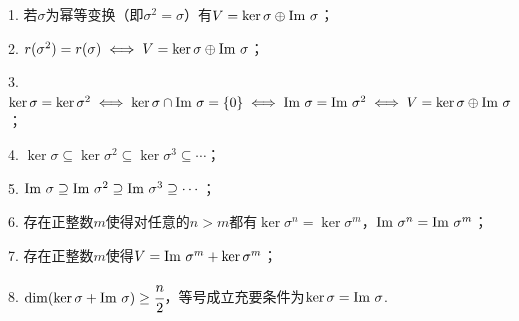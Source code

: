 1. 若$\sigma$为幂等变换（即$\sigma^2=\sigma$）有$V=\ker\sigma\oplus\textup{Im }\sigma$；

2. $r(\sigma^2)=r(\sigma) \iff V=\ker\sigma\oplus\textup{Im }\sigma$；

3. $\ker\sigma=\ker\sigma^2 \iff \ker\sigma \cap \textup{Im }\sigma=\{0\} \iff \textup{Im }\sigma=\textup{Im }\sigma^2 \iff V=\ker\sigma\oplus \textup{Im }\sigma$；

4. $\ker\sigma \subseteq \ker\sigma^2 \subseteq \ker\sigma^3 \subseteq \cdots$；

5. $\textup{Im }\sigma \supseteq \textup{Im }\sigma^2 \supseteq \textup{Im }\sigma^3 \supseteq \cdots$；

6. 存在正整数$m$使得对任意的$n>m$都有$\ker\sigma^n=\ker\sigma^m$，$\textup{Im }\sigma^n=\textup{Im }\sigma^m$；

7. 存在正整数$m$使得$V=\textup{Im }\sigma^m+\ker\sigma^m$；

8. $\dim(\ker\sigma+\textup{Im }\sigma) \ge \cfrac{n}{2}$，等号成立充要条件为$\ker\sigma=\textup{Im }\sigma$.
